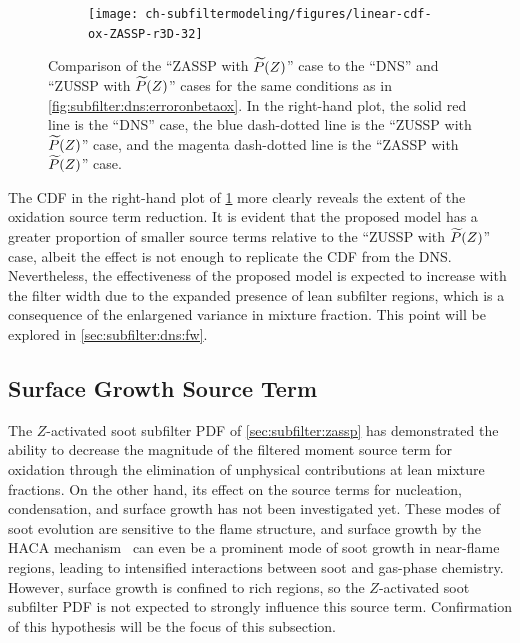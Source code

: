 \begin{figure}[ht]
\begin{subfigure}[b]{0.33\linewidth}
  \end{subfigure}%
  \begin{subfigure}[b]{0.33\linewidth}
    \centering
    \texttt{[image: ch-subfiltermodeling/figures/linear-cdf-ox-ZASSP-r3D-32]}
  \end{subfigure}
  \caption[Comparison of ZASSP with \texorpdfstring{$\pz$}{P(Z)} to DNS \& ZUSSP with \texorpdfstring{$\pz$}{P(Z)} for \texorpdfstring{$\fst[M]{1,0}^{ox}$}{M1,0ox}]{Comparison of the ``ZASSP with $\pz$'' case to the ``DNS'' and ``ZUSSP with $\pz$'' cases for the same conditions as in \cref{fig:subfilter:dns:erroronbetaox}. In the right-hand plot, the solid red line is the ``DNS'' case, the blue dash-dotted line is the ``ZUSSP with $\pz$'' case, and the magenta dash-dotted line is the ``ZASSP with $\pz$'' case.}
  \label{fig:subfilter:dns:zasspcomparisonox}
\end{figure}

The CDF in the right-hand plot of \cref{fig:subfilter:dns:zasspcomparisonox} more clearly reveals the extent of the oxidation source term reduction. It is evident that the proposed model has a greater proportion of smaller source terms relative to the ``ZUSSP with $\pz$'' case, albeit the effect is not enough to replicate the CDF from the DNS. Nevertheless, the effectiveness of the proposed model is expected to increase with the filter width due to the expanded presence of lean subfilter regions, which is a consequence of the enlargened variance in mixture fraction. This point will be explored in \cref{sec:subfilter:dns:fw}.


\subsection{Surface Growth Source Term}
\label{sec:subfilter:dns:sg}

The $Z$-activated soot subfilter PDF of \cref{sec:subfilter:zassp} has demonstrated the ability to decrease the magnitude of the filtered moment source term for oxidation through the elimination of unphysical contributions at lean mixture fractions. On the other hand, its effect on the source terms for nucleation, condensation, and surface growth has not been investigated yet. These modes of soot evolution are sensitive to the flame structure, and surface growth by the HACA mechanism~\cite{frenklach1985,frenklach1991} can even be a prominent mode of soot growth in near-flame regions, leading to intensified interactions between soot and gas-phase chemistry. However, surface growth is confined to rich regions, so the $Z$-activated soot subfilter PDF is not expected to strongly influence this source term. Confirmation of this hypothesis will be the focus of this subsection.

